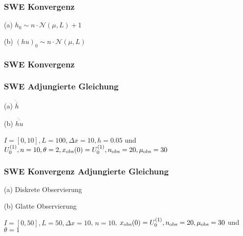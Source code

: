 \begin{frame}[<+->]
\frametitle{SWE Konvergenz}
\centering
\begin{minipage}[b]{0.49\linewidth}
\centering

(a) $h_0 \sim n\cdot\mathcal N(\mu,L) + 1$
\end{minipage}
\begin{minipage}[b]{0.49\linewidth}
\centering

(b)  $(hu)_0\sim n\cdot\mathcal N(\mu,L)$
\end{minipage}

\end{frame}


\begin{frame}[<+->]
\frametitle{SWE Konvergenz}
\centering
\scalebox{0.9}{}
\end{frame}

\begin{frame}[<+->]
\frametitle{SWE Adjungierte Gleichung}
\centering
\begin{minipage}[b]{0.49\linewidth}
\centering

(a) $\dot{\overline{h}}$
\end{minipage}
\begin{minipage}[b]{0.49\linewidth}
\centering

(b) $\dot{\overline{hu}}$
\end{minipage}
\centering
$I=[0,10], L=100,\Delta x=10,h = 0.05$ und $U_0^{(1)},n=10,\theta=2,x_\text{obs}(0)=U_0^{(1)},n_{\text{obs}}=20,\mu_{\text{obs}}=30$
\end{frame}

\begin{frame}[<+->]
\frametitle{SWE Konvergenz Adjungierte Gleichung}
\begin{minipage}[b]{0.49\linewidth}
\centering

(a) Diskrete Observierung
\end{minipage}
\begin{minipage}[b]{0.49\linewidth}
\centering

(b) Glatte Observierung
\end{minipage}
\centering
$I=[0,50],L=50,\Delta x=10$, $n=10$, $x_\text{obs}(0) = U_0^{(1)}, n_{\text{obs}}=20,\mu_{\text{obs}}=30$ und $\theta=1$
\end{frame}

